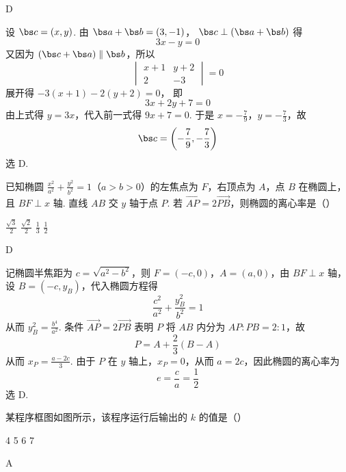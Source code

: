 \begin{answer}
D
\end{answer}

\begin{solution}
设 \(\bs c=(x,y)\). 由 \(\bs a+\bs b=(3,-1)\)，
\(\bs c\perp(\bs a+\bs b)\) 得
\[
3x-y=0
\]
又因为 \((\bs c+\bs a)\parallel\bs b\)，所以
\[
\begin{vmatrix}x+1&y+2\\2&-3\end{vmatrix}=0
\]
展开得 \(-3(x+1)-2(y+2)=0\)，
即
\[
3x+2y+7=0
\]
由上式得 \(y=3x\)，代入前一式得 \(9x+7=0\).
于是 \(x=-\frac79\)，\(y=-\frac73\)，故
\[
\bs c=\left(-\frac79,-\frac73\right)
\]
选 D.
\end{solution}

\begin{problem}
已知椭圆 \(\frac{x^2}{a^2} + \frac{y^2}{b^2} = 1\)（\(a > b > 0\)）的左焦点为 \(F\)，右顶点为 \(A\)，点 \(B\) 在椭圆上，且 \(BF \perp x\) 轴. 直线 \(AB\) 交 \(y\) 轴于点 \(P\). 若 \(\overrightarrow{AP} = 2\overrightarrow{PB}\)，则椭圆的离心率是（\quad）

\choices
    {\(\frac{\sqrt{3}}{2}\)}
    {\(\frac{\sqrt{2}}{2}\)}
    {\(\frac{1}{3}\)}
    {\(\frac{1}{2}\)}
\end{problem}

\begin{answer}
D
\end{answer}

\begin{solution}
记椭圆半焦距为 \(c=\sqrt{a^2-b^2}\)，则
\(F=(-c,0)\)，\(A=(a,0)\)，由 \(BF\perp x\) 轴，设
\(B=(-c,y_B)\)，代入椭圆方程得
\[
\frac{c^2}{a^2}+\frac{y_B^2}{b^2}=1
\]
从而 \(y_B^2=\frac{b^4}{a^2}\).
条件 \(\overrightarrow{AP}=2\overrightarrow{PB}\) 表明 \(P\) 将 \(AB\) 内分为
\(AP:PB=2:1\)，故
\[
P=A+\frac23(B-A)
\]
从而 \(x_P=\frac{a-2c}{3}\).
由于 \(P\) 在 \(y\) 轴上，\(x_P=0\)，从而 \(a=2c\)，因此椭圆的离心率为
\[
e=\frac ca=\frac12
\]
选 D.
\end{solution}

\begin{problem}
某程序框图如图所示，该程序运行后输出的 \(k\) 的值是（\quad）


\choices
    {4}
    {5}
    {6}
    {7}
\end{problem}

\begin{answer}
A
\end{answer}

